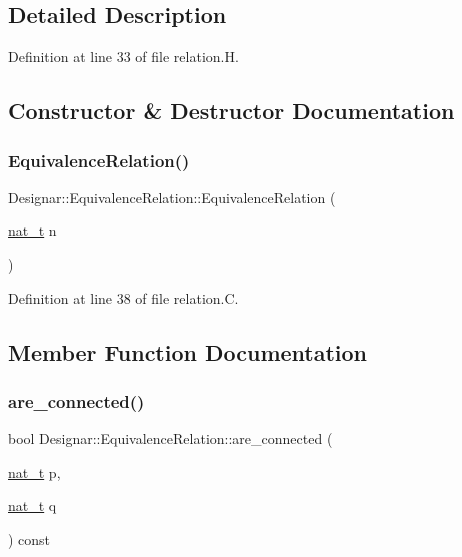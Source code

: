 \subsection{Detailed Description}


Definition at line 33 of file relation.\+H.



\subsection{Constructor \& Destructor Documentation}
\mbox{\label{class_designar_1_1_equivalence_relation_a44544ffad6df87c47b30a6cd2a7254f2}} 
\subsubsection{\texorpdfstring{Equivalence\+Relation()}{EquivalenceRelation()}}
{\footnotesize\ttfamily Designar\+::\+Equivalence\+Relation\+::\+Equivalence\+Relation (\begin{DoxyParamCaption}\item[{\hyperlink{namespace_designar_aa72662848b9f4815e7bf31a7cf3e33d1}{nat\+\_\+t}}]{n }\end{DoxyParamCaption})}



Definition at line 38 of file relation.\+C.



\subsection{Member Function Documentation}
\mbox{\label{class_designar_1_1_equivalence_relation_a98972f1d96957b9fac030ca3001094e6}} 
\subsubsection{\texorpdfstring{are\+\_\+connected()}{are\_connected()}}
{\footnotesize\ttfamily bool Designar\+::\+Equivalence\+Relation\+::are\+\_\+connected (\begin{DoxyParamCaption}\item[{\hyperlink{namespace_designar_aa72662848b9f4815e7bf31a7cf3e33d1}{nat\+\_\+t}}]{p,  }\item[{\hyperlink{namespace_designar_aa72662848b9f4815e7bf31a7cf3e33d1}{nat\+\_\+t}}]{q }\end{DoxyParamCaption}) const}



